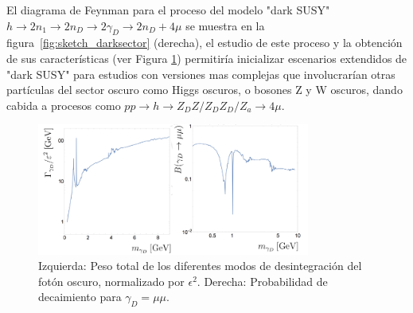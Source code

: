 



El diagrama de Feynman para el proceso del modelo "dark SUSY" $h\rightarrow 2n_{1}\rightarrow 2n_{D}\rightarrow 2\gamma_{D} \rightarrow 2n_{D} + 4\mu$ se muestra en la figura~\ref{fig:sketch_darksector} (derecha), el estudio de este proceso y la obtención de sus características (ver Figura \ref{fig:foton_oscuro}) permitiría inicializar escenarios extendidos de "dark SUSY" para estudios con versiones mas complejas que involucrarían otras partículas del sector oscuro como Higgs oscuros, o bosones Z y W oscuros, dando cabida a procesos como $pp\rightarrow h \rightarrow Z_{D}Z/Z_{D}Z_{D}/Z_{a}\rightarrow 4\mu$. %


\begin{figure}[h]
    \centering
    \includegraphics[width=0.8\textwidth]{HIPOTESIS/foton_oscuro.png}
    \caption{Izquierda: Peso total de los diferentes modos de desintegración del fotón oscuro, normalizado por $\epsilon^2$. Derecha: Probabilidad de decaimiento para $\gamma_D = \mu \mu$.}
    \label{fig:foton_oscuro}
\end{figure}














